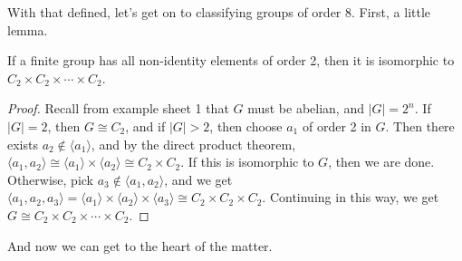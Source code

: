 \documentclass[a4]{scrreprt}
\begin{document}
With that defined, let's get on to classifying groups of order 8.
First, a little lemma.

\begin{lemma}
	If a finite group has all non-identity elements of order 2, then it is isomorphic to $C_2 \times C_2 \times \cdots \times C_2$.
\end{lemma}
\begin{proof}
	Recall from example sheet 1 that $G$ must be abelian, and $|G| = 2^n$. If $|G| = 2$, then $G \cong C_2$, and if $|G| > 2$, then choose $a_1$ of order 2 in $G$. Then there exists $a_2 \not \in \langle a_1 \rangle$, and by the direct product theorem, $\langle a_1, a_2 \rangle \cong \langle a_1 \rangle \times \langle a_2 \rangle \cong C_2 \times C_2$.
	If this is isomorphic to $G$, then we are done. Otherwise, pick $a_3 \not \in \langle a_1, a_2 \rangle$, and we get $\langle a_1, a_2, a_3 \rangle = \langle a_1 \rangle \times \langle a_2 \rangle \times \langle a_3 \rangle \cong C_2 \times C_2 \times C_2$. Continuing in this way, we get $G \cong C_2 \times C_2 \times \cdots \times C_2$. 
\end{proof}

And now we can get to the heart of the matter.
\end{document}
